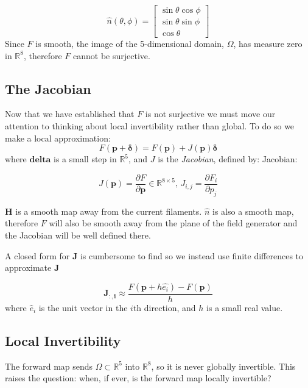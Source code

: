 \begin{equation}
  \hat{n}(\theta,\phi) = 
  \begin{bmatrix}
    \sin\theta\cos\phi \\ \sin\theta\sin\phi \\ \cos\theta
  \end{bmatrix}
\end{equation}
Since $F$ is smooth, the image of the 5-dimensional domain, $\Omega$, has measure zero in $\mathbb{R}^8$, therefore $F$ cannot be surjective.

\subsection{The Jacobian}
Now that we have established that $F$ is not surjective we must move our attention to thinking about local invertibility rather than global. To do so we make a local approximation:
\begin{equation}
  F(\mathbf{p} + \mathbf{\delta}) = F(\mathbf{p}) + J(\mathbf{p})\mathbf{\delta}
\end{equation}
where $\mathbf{delta}$ is a small step in $\mathbb{R}^5$, and $J$ is the \emph{Jacobian}, defined by:
Jacobian:
\begin{definition}[Jacobian]
  $$ J(\mathbf{p}) = \frac{\partial F}{\partial \mathbf{p}} \in \mathbb{R}^{8\times5} \text{, } J_{i,j} = \frac{\partial F_i}{\partial p_j} $$
\end{definition}
$\mathbf{H}$ is a smooth map away from the current filaments. $\hat{n}$ is also a smooth map, therefore $F$ will also be smooth away from the plane of the field generator and the Jacobian will be well defined there.

A closed form for $\mathbf{J}$ is cumbersome to find so we instead use finite differences to approximate $\mathbf{J}$

\begin{equation}\label{eq:jacobian}
\mathbf{J_{:,i}} \approx \frac{F\left(\mathbf{p} + h  \hat{e_i} \right) - F(\mathbf{p})}{h}
\end{equation}
where $\hat{e}_i$ is the unit vector in the $i$th direction, and $h$ is a small real value.

\subsection{Local Invertibility}
The forward map sends $\Omega \subset \mathbb{R}^5$ into $\mathbb{R}^8$, so it is never
globally invertible. This raises the question: when, if ever, is the forward map
locally invertible?


